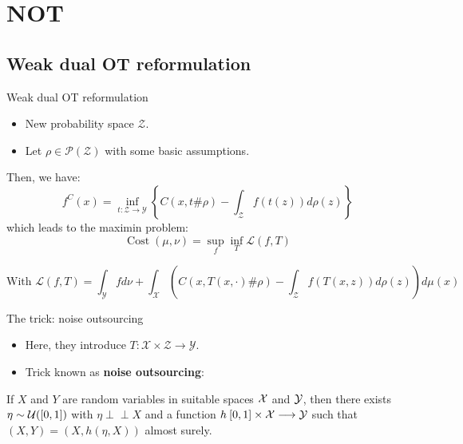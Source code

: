 \documentclass[aspectratio=169]{beamer}
\DeclareMathOperator*{\Cost}{\text{Cost}}
\newcommand{\indep}{\perp \!\!\! \perp}
\begin{document}
\section{NOT}

\subsection{Weak dual OT reformulation}
\begin{frame}{Weak dual OT reformulation}
    \begin{itemize}
        \item New probability space $\mathcal{Z}$.
        \item Let $\rho\in \mathcal{P}(\mathcal{Z})$ with some basic assumptions.
    \end{itemize}
    Then, we have:
    \begin{equation}
        f^C(x)=\inf_{t:\mathcal{Z}\to \mathcal{Y}} \left\{C(x, t\#\rho)-\int_{\mathcal{Z}}f(t(z))d\rho(z)\right\}
    \end{equation}
    which leads to the maximin problem:
    \begin{equation}
        \Cost(\mu,\nu) = \sup_{f} \inf_{T} \mathcal{L}(f,T)
    \end{equation}

    $$\text{With }\mathcal{L}(f,T) = \int_{\mathcal{Y}}fd\nu + \int_{\mathcal{X}} \left( C(x, T(x,\cdot)\#\rho)-\int_{\mathcal{Z}}f(T(x,z))d\rho(z)\right)d\mu(x)$$

\end{frame}

\begin{frame}{The trick: noise outsourcing}
    \begin{itemize}
        \item Here, they introduce $T:\mathcal{X}\times\mathcal{Z}\to\mathcal{Y}$.
        \item Trick known as \textbf{noise outsourcing}:
    \end{itemize}

    \begin{theorem}
        If $X$ and $Y$ are random variables in suitable spaces ${\cal X}$ and ${\cal Y}$, then there exists $\eta\sim {\cal U}([0,1])$ with $\eta \indep X$ and a function $h\: [0, 1]\times {\cal X} \longrightarrow {\cal Y}$ such that $(X, Y) = (X, h(\eta, X))$ almost surely.
    \end{theorem}
\end{frame}
\end{document}
